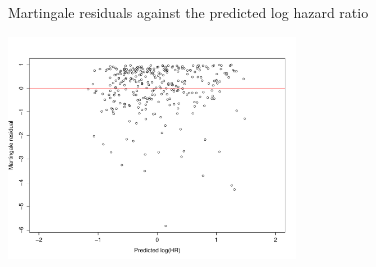 \documentclass[envcountsect, 10pt, portrait, palatino]{beamer}
\begin{document}
\begin{frame}{Martingale residuals against the predicted log hazard ratio}
\centerline{\includegraphics[width=3in]{martres_pred.pdf}}
\end{frame}
\end{document}
